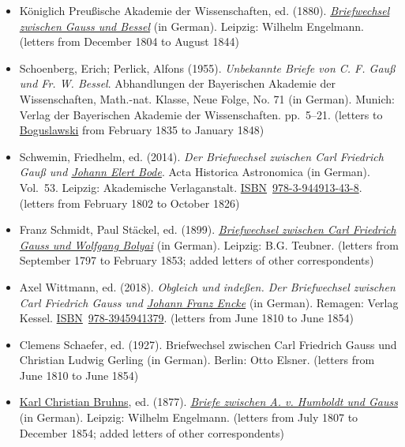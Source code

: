 \begin{itemize}
\tightlist
\item
  {Königlich Preußische Akademie der Wissenschaften, ed. (1880). \href{https://archive.org/details/briefwechselzwi00berlgoog/page/n5/mode/2up}{\emph{Briefwechsel zwischen Gauss und Bessel}} (in German). Leipzig: Wilhelm Engelmann.{} (letters from December 1804 to August 1844)}
\item
  {Schoenberg, Erich; Perlick, Alfons (1955). \emph{Unbekannte Briefe von C. F. Gauß und Fr. W. Bessel}. Abhandlungen der Bayerischen Akademie der Wissenschaften, Math.-nat. Klasse, Neue Folge, No. 71 (in German). Munich: Verlag der Bayerischen Akademie der Wissenschaften. pp.{~}{5--}21.{} (letters to \href{https://en.wikipedia.org/wiki/Palm_Heinrich_Ludwig_von_Boguslawski}{Boguslawski} from February 1835 to January 1848)}
\item
  {Schwemin, Friedhelm, ed. (2014). \emph{Der Briefwechsel zwischen Carl Friedrich Gauß und \href{https://en.wikipedia.org/wiki/Johann_Elert_Bode}{Johann Elert Bode}}. Acta Historica Astronomica (in German). Vol.{~}53. Leipzig: Akademische Verlaganstalt. \href{https://en.wikipedia.org/wiki/ISBN_(identifier)}{ISBN}{~}\href{https://en.wikipedia.org/wiki/Special:BookSources/978-3-944913-43-8}{978-3-944913-43-8}.{} (letters from February 1802 to October 1826)}
\item
  {Franz Schmidt, Paul Stäckel, ed. (1899). \href{https://archive.org/details/briefwechselzwi00gausgoog/page/n4/mode/2up}{\emph{Briefwechsel zwischen Carl Friedrich Gauss und Wolfgang Bolyai}} (in German). Leipzig: B.G. Teubner.{} (letters from September 1797 to February 1853; added letters of other correspondents)}
\item
  {Axel Wittmann, ed. (2018). \emph{Obgleich und indeßen. Der Briefwechsel zwischen Carl Friedrich Gauss und \href{https://en.wikipedia.org/wiki/Johann_Franz_Encke}{Johann Franz Encke}} (in German). Remagen: Verlag Kessel. \href{https://en.wikipedia.org/wiki/ISBN_(identifier)}{ISBN}{~}\href{https://en.wikipedia.org/wiki/Special:BookSources/978-3945941379}{978-3945941379}.{} (letters from June 1810 to June 1854)}
\item
  {Clemens Schaefer, ed. (1927). Briefwechsel zwischen Carl Friedrich Gauss und Christian Ludwig Gerling (in German). Berlin: Otto Elsner.{} (letters from June 1810 to June 1854)}
\item
  {\href{https://en.wikipedia.org/wiki/Karl_Christian_Bruhns}{Karl Christian Bruhns}, ed. (1877). \href{https://archive.org/details/briefezwischena00gausgoog/page/n5/mode/2up}{\emph{Briefe zwischen A. v. Humboldt und Gauss}} (in German). Leipzig: Wilhelm Engelmann.{} (letters from July 1807 to December 1854; added letters of other correspondents)}

\end{itemize}
